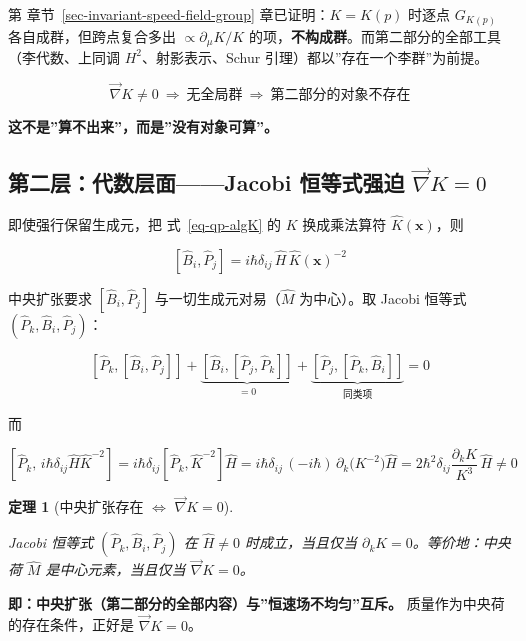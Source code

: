 \documentclass[
  chinese,
  a4paper,
  UTF8,
  12pt,
  oneside,
  openany]{ctexbook}
\theoremstyle{plain}
\newtheorem{theorem}{定理}[chapter]
\theoremstyle{plain}
\theoremstyle{plain}
\theoremstyle{definition}
\theoremstyle{plain}
\theoremstyle{plain}
\theoremstyle{remark}
\begin{document}
第 章节~\ref{sec-invariant-speed-field-group} 章已证明：\(K=K(p)\)
时逐点 \(G_{K(p)}\) 各自成群，但跨点复合多出 \(\propto\partial_\mu K/K\)
的项，\textbf{不构成群}。而第二部分的全部工具（李代数、上同调
\(H^{2}\)、射影表示、Schur 引理）都以''存在一个李群''为前提。

\[
\vec\nabla K\neq0\ \Longrightarrow\ \text{无全局群}\ \Longrightarrow\ \text{第二部分的对象不存在}
\]

\textbf{这不是''算不出来''，而是''没有对象可算''。}

\subsection{\texorpdfstring{第二层：代数层面------Jacobi 恒等式强迫
\(\vec\nabla K=0\)}{第二层：代数层面------Jacobi 恒等式强迫 \textbackslash vec\textbackslash nabla K=0}}\label{ux7b2cux4e8cux5c42ux4ee3ux6570ux5c42ux9762jacobi-ux6052ux7b49ux5f0fux5f3aux8feb-vecnabla-k0}

即使强行保留生成元，把 式~\ref{eq-qp-algK} 的 \(K\) 换成乘法算符
\(\hat K(\mathbf x)\)，则

\[
[\hat B_i,\hat P_j]=i\hbar\delta_{ij}\,\hat H\,\hat K(\mathbf x)^{-2}
\]

中央扩张要求 \([\hat B_i,\hat P_j]\) 与一切生成元对易（\(\hat M\)
为中心）。取 Jacobi 恒等式 \((\hat P_k,\hat B_i,\hat P_j)\)：

\[
[\hat P_k,[\hat B_i,\hat P_j]]+\underbrace{[\hat B_i,[\hat P_j,\hat P_k]]}_{=0}+\underbrace{[\hat P_j,[\hat P_k,\hat B_i]]}_{\text{同类项}}=0
\]

而

\[
[\hat P_k,\,i\hbar\delta_{ij}\hat H\hat K^{-2}]
=i\hbar\delta_{ij}[\hat P_k,\hat K^{-2}]\hat H
=i\hbar\delta_{ij}\,(-i\hbar)\,\partial_k\!\bigl(K^{-2}\bigr)\hat H
=2\hbar^{2}\delta_{ij}\frac{\partial_kK}{K^{3}}\,\hat H\neq0
\]

\begin{theorem}[中央扩张存在 \(\Longleftrightarrow\)
\(\vec\nabla K=0\)]\protect\hypertarget{thm-qp-jacobi}{}\label{thm-qp-jacobi}

Jacobi 恒等式 \((\hat P_k,\hat B_i,\hat P_j)\) 在 \(\hat H\neq0\)
时成立，当且仅当 \(\partial_kK=0\)。等价地：中央荷 \(\hat M\)
是中心元素，当且仅当 \(\vec\nabla K=0\)。

\end{theorem}

\textbf{即：中央扩张（第二部分的全部内容）与''恒速场不均匀''互斥。}
质量作为中央荷的存在条件，正好是 \(\vec\nabla K=0\)。
\end{document}
